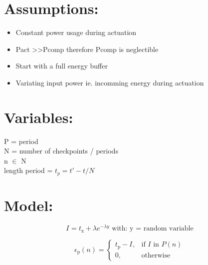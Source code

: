 \documentclass[11pt,twoside,a4paper]{article}
\begin{document}


\section{Assumptions:}
 
\begin{itemize}
\item Constant power usage during actuation
\item Pact \textgreater\textgreater\phantom Pcomp therefore Pcomp is neglectible
\item Start with a full energy buffer
\item Variating input power ie. incomming energy during actuation
\end{itemize}

\section{Variables:}

P = period \\%
N = number of checkpoints / periods \\
n $\in$ N \\
length period = $ t_{p} = t' - t / N $

\section{Model:}

\begin{equation}
I_{\text{}} = t_{\text{x}} + \lambda e^{-\lambda y} \text{ with: y = random variable}
\end{equation}

\begin{equation}
\epsilon_{\text{p}}(n) =
    \begin{cases}
      t_{\text{p}} - I_{\text{}}, & \text{if } I \text{ in } P(n)  \\
      0, & \text{otherwise}
    \end{cases}
\end{equation}
\end{document}
